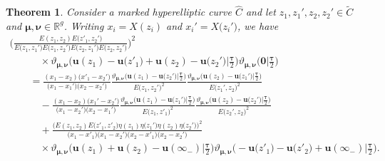 \documentclass[pdftex]{sigma}
\numberwithin{equation}{section}
\newtheorem{Theorem}{Theorem}[section]
\begin{document}
\begin{Theorem}\label{thm:formula_beta_1}
 Consider a marked hyperelliptic curve $\widehat{C}$ and let
 $z_1,z_1',z_2,z_2' \in \widetilde{C}$ and $\bm{\mu}, \bm{\nu} \in \mathbb{R}^g$. Writing
 $x_i = X(z_i)$ and $x_i' = X\big(z_i'\big)$, we have
 \begin{gather}
  \biggl(\frac{E(z_1, z_2)E\bigl(z'_1, z_2'\bigr)}{E\bigl(z_1, z_1'\bigr)E\bigl(z_1, z_2'\bigr)E\bigl(z_2, z_1'\bigr)E\bigl(z_2, z_2'\bigr)}\biggr)^{2}\nonumber\\
  \qquad \quad{}\times\vartheta_{\bm{\mu}, \bm{\nu}}\bigl( \bm{u}(z_1) - \bm{u}\bigl(z'_1\bigr) + \bm{u}(z_2) - \bm{u}\bigl(z_2'\bigr)\big|\tfrac{\bm{\tau}}{2}\bigr)\vartheta_{\bm{\mu},\bm{\nu}}\bigl(\bm{0}\big|\tfrac{\bm{\tau}}{2}\bigr)\nonumber \\
 \qquad {}= \frac{(x_1 - x_2)\bigl(x'_1 - x_2'\bigr)}{\bigl(x_1 - x_1'\bigr)\bigl(x_2 - x_2'\bigr)}\frac{\vartheta_{\bm{\mu},\bm{\nu}}\bigl( \bm{u}(z_1) - \bm{u}\bigl(z_2'\bigr)\big|\tfrac{\bm{\tau}}{2}\bigr)}{E\bigl(z_1,z_2'\bigr)^{2}}\frac{\vartheta_{\bm{\mu},\bm{\nu}}\bigl(\bm{u}(z_2) - \bm{u}\bigl(z_1'\bigr)\big|\tfrac{\bm{\tau}}{2}\bigr)}{E\bigl(z_1',z_2\bigr)^{2}}\nonumber\\
 \qquad\quad{}-\frac{(x_1 - x_2)\bigl(x_1' - x_2'\bigr)}{\bigl(x_1 - x_2'\bigr)\bigl(x_2 - x_1'\bigr)}\frac{\vartheta_{\bm{\mu},\bm{\nu}}\bigl(\bm{u}(z_1) - \bm{u}\bigl(z_1'\bigr)\big|\tfrac{\bm{\tau}}{2}\bigr)}{E\bigl(z_1, z'_1\bigr)^{2}}\frac{\vartheta_{\bm{\mu},\bm{\nu}}(\bm{u}(z_2) - \bm{u}\bigl(z_2'\bigr)\big|\tfrac{\bm{\tau}}{2}\bigr)}{E\bigl(z_2', z_2\bigr)^{2}}\nonumber\\
 \qquad\quad{}+\frac{\bigl(E(z_1,z_2)E\bigl(z'_1, z'_2\bigr) \eta(z_1)\eta\bigl(z_1'\bigr)\eta(z_2)\eta\bigl(z_2'\bigr)\bigr)^2}{\bigl(x_1 - x'_1\bigr)\bigl(x_1 -x_2'\bigr)\bigl(x_2 - x'_1\bigr)\bigl(x_2 - x_2'\bigr)} \nonumber\\
 \qquad \quad{} \times \vartheta_{\bm{\mu},\bm{\nu}}\bigl( \bm{u}(z_1) + \bm{u}(z_2) - \bm{u}(\infty_-)\big|\tfrac{\bm{\tau}}{2}\bigr) \vartheta_{\bm{\mu},\bm{\nu}}\bigl(-\bm{u}\bigl(z'_1\bigr) - \bm{u}\bigl(z'_2\bigr) + \bm{u}(\infty_-)\big|\tfrac{\bm{\tau}}{2}\bigr).\label{eq:formula-beta-1}
 \end{gather}
\end{Theorem}
\end{document}
